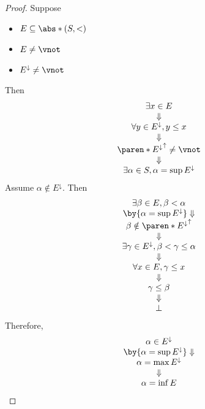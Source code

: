 \begin{proof}
  Suppose
  \begin{itemize}
    \item $E \subseteq \abs*{(S, <)}$
    \item $E \neq \vnot$
    \item $E^{\downarrow} \neq \vnot$
  \end{itemize}
  Then
  \[
    \begin{array}{c}
      \exists x \in E                               \\
      \Downarrow                                    \\
      \forall y \in E^{\downarrow}, y \leq x        \\
      \Downarrow                                    \\
      \paren*{E^{\downarrow}}^{\uparrow} \neq \vnot \\
      \Downarrow                                    \\
      \exists \alpha \in S, \alpha = \sup E^{\downarrow}
    \end{array}
  \]
  Assume $\alpha \notin E^{\downarrow}$. Then
  \[
    \begin{array}{c}
      \exists \beta \in E, \beta < \alpha                           \\
      \by{\ensuremath{\alpha = \sup E^{\downarrow}}} \Downarrow     \\
      \beta \notin \paren*{E^{\downarrow}}^{\uparrow}               \\
      \Downarrow                                                    \\
      \exists \gamma \in E^{\downarrow}, \beta < \gamma \leq \alpha \\
      \Downarrow                                                    \\
      \forall x \in E, \gamma \leq x                                \\
      \Downarrow                                                    \\
      \gamma \leq \beta                                             \\
      \Downarrow                                                    \\
      \bot
    \end{array}
  \]
  Therefore,
  \[
    \begin{array}{c}
      \alpha \in E^{\downarrow}                                 \\
      \by{\ensuremath{\alpha = \sup E^{\downarrow}}} \Downarrow \\
      \alpha = \max E^{\downarrow}                              \\
      \Downarrow                                                \\
      \alpha = \inf E
    \end{array}
  \]
\end{proof}
